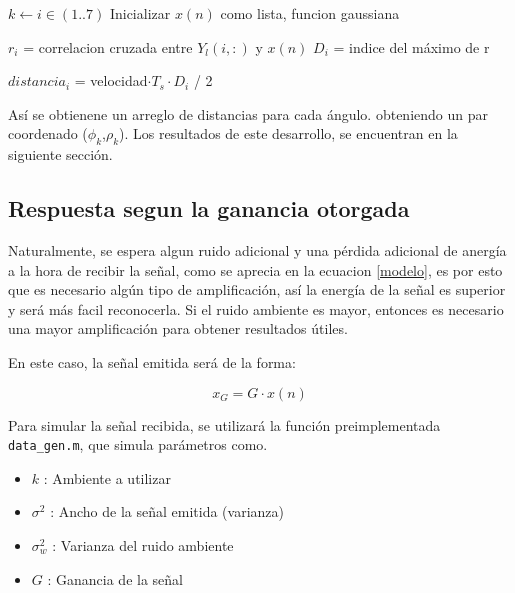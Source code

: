 \documentclass[letterpaper,11pt]{article}
\begin{document}
\begin{algorithm}[H]
\begin{algorithmic}
	\State $k \gets i \in (1..7)$
    \State Inicializar $x(n)$ como lista, funcion gaussiana
    
		\State $r_{i}$ = correlacion cruzada entre $Y_{l}(i,:)$ y $x(n)$
		\State $D_{i}$ = indice del máximo de r	
    \EndFor
    
    \State $distancia_{i}$ = velocidad$\cdot T_{s} \cdot D_{i}$ / 2
\end{algorithmic}
\end{algorithm}




Así se obtienene un arreglo de distancias para cada ángulo. obteniendo un par coordenado ($\phi_{k}$,$\rho_{k}$). Los resultados de este desarrollo, se encuentran en la siguiente sección.

\subsection{Respuesta segun la ganancia otorgada}

Naturalmente, se espera algun ruido adicional y una pérdida adicional de anergía a la hora de recibir la señal, como se aprecia en la ecuacion \eqref{modelo}, es por esto que es necesario algún tipo de amplificación, así la energía de la señal es superior y será más facil reconocerla. Si el ruido ambiente es mayor, entonces es necesario una mayor amplificación para obtener resultados útiles.\par

En este caso, la señal emitida será de la forma:

\begin{equation}
x_{G} = G\cdot x(n)
\end{equation}

Para simular la señal recibida, se utilizará la función preimplementada \texttt{data\_gen.m}, que simula parámetros como.

\begin{itemize}

\item $k$ : Ambiente a utilizar

\item $\sigma^2$ : Ancho de la señal emitida (varianza)

\item $\sigma_{w}^2$ : Varianza del ruido ambiente

\item $G$ : Ganancia de la señal

\end{itemize}
\end{document}
